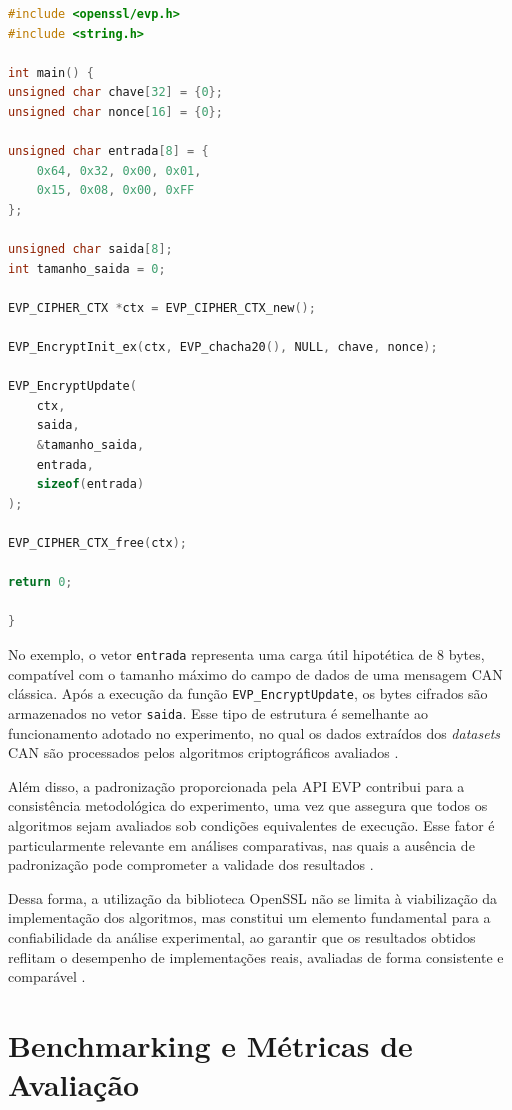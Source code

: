 \begin{lstlisting}[language=C, caption={Exemplo simplificado de cifragem com ChaCha20 utilizando OpenSSL}, label={lst:chacha20_openssl}]
#include <openssl/evp.h>
#include <string.h>

int main() {
unsigned char chave[32] = {0};
unsigned char nonce[16] = {0};

unsigned char entrada[8] = {
    0x64, 0x32, 0x00, 0x01,
    0x15, 0x08, 0x00, 0xFF
};

unsigned char saida[8];
int tamanho_saida = 0;

EVP_CIPHER_CTX *ctx = EVP_CIPHER_CTX_new();

EVP_EncryptInit_ex(ctx, EVP_chacha20(), NULL, chave, nonce);

EVP_EncryptUpdate(
    ctx,
    saida,
    &tamanho_saida,
    entrada,
    sizeof(entrada)
);

EVP_CIPHER_CTX_free(ctx);

return 0;

}
\end{lstlisting}

No exemplo, o vetor \texttt{entrada} representa uma carga útil hipotética de 8 bytes, compatível com o tamanho máximo do campo de dados de uma mensagem CAN clássica. Após a execução da função \texttt{EVP\_EncryptUpdate}, os bytes cifrados são armazenados no vetor \texttt{saida}. Esse tipo de estrutura é semelhante ao funcionamento adotado no experimento, no qual os dados extraídos dos \textit{datasets} CAN são processados pelos algoritmos criptográficos avaliados \cite{openssl2023,viega2002network}.

Além disso, a padronização proporcionada pela API EVP contribui para a consistência metodológica do experimento, uma vez que assegura que todos os algoritmos sejam avaliados sob condições equivalentes de execução. Esse fator é particularmente relevante em análises comparativas, nas quais a ausência de padronização pode comprometer a validade dos resultados \cite{georges2007statistically}.

Dessa forma, a utilização da biblioteca OpenSSL não se limita à viabilização da implementação dos algoritmos, mas constitui um elemento fundamental para a confiabilidade da análise experimental, ao garantir que os resultados obtidos reflitam o desempenho de implementações reais, avaliadas de forma consistente e comparável \cite{krovetz2011software}.

\section{Benchmarking e Métricas de Avaliação}

